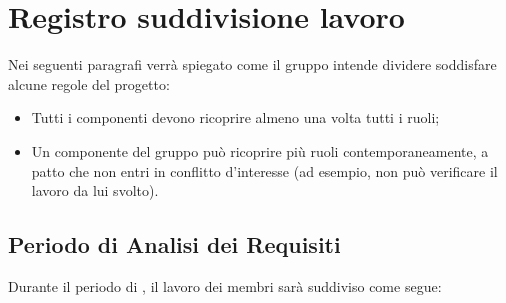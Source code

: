 \newpage



\section{Registro suddivisione lavoro}
Nei seguenti paragrafi verrà spiegato come il gruppo intende dividere soddisfare alcune regole del progetto:
\begin{itemize}
	\item Tutti i componenti devono ricoprire almeno una volta tutti i ruoli; 
	\item Un componente del gruppo può ricoprire più ruoli contemporaneamente, a patto che non entri in conflitto d'interesse (ad esempio, non può verificare il lavoro da lui svolto).
\end{itemize}

\subsection{Periodo di Analisi dei Requisiti}
Durante il periodo di \AdR, il lavoro dei membri sarà suddiviso come segue:

